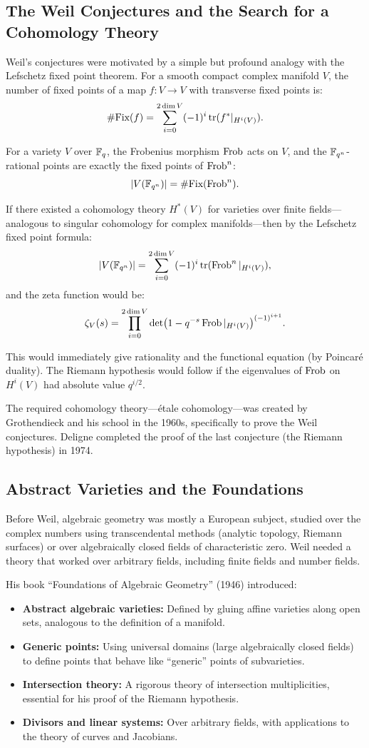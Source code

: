 \subsection{The Weil Conjectures and the Search for a Cohomology Theory}

Weil's conjectures were motivated by a simple but profound analogy with the Lefschetz fixed point theorem. For a smooth compact complex manifold $V$, the number of fixed points of a map $f: V \to V$ with transverse fixed points is:
\[
\#\text{Fix}(f) = \sum_{i=0}^{2\dim V} (-1)^i \operatorname{tr}(f^*|_{H^i(V)}).
\]

For a variety $V$ over $\mathbb{F}_q$, the Frobenius morphism $\operatorname{Frob}$ acts on $V$, and the $\mathbb{F}_{q^n}$-rational points are exactly the fixed points of $\operatorname{Frob}^n$:
\[
|V(\mathbb{F}_{q^n})| = \#\text{Fix}(\operatorname{Frob}^n).
\]

If there existed a cohomology theory $H^*(V)$ for varieties over finite fields---analogous to singular cohomology for complex manifolds---then by the Lefschetz fixed point formula:
\[
|V(\mathbb{F}_{q^n})| = \sum_{i=0}^{2\dim V} (-1)^i \operatorname{tr}(\operatorname{Frob}^n |_{H^i(V)}),
\]
and the zeta function would be:
\[
\zeta_V(s) = \prod_{i=0}^{2\dim V} \det(1 - q^{-s} \operatorname{Frob}|_{H^i(V)})^{(-1)^{i+1}}.
\]

This would immediately give rationality and the functional equation (by Poincar\'{e} duality). The Riemann hypothesis would follow if the eigenvalues of $\operatorname{Frob}$ on $H^i(V)$ had absolute value $q^{i/2}$.

The required cohomology theory---\'{e}tale cohomology---was created by Grothendieck and his school in the 1960s, specifically to prove the Weil conjectures. Deligne completed the proof of the last conjecture (the Riemann hypothesis) in 1974.

\subsection{Abstract Varieties and the Foundations}

Before Weil, algebraic geometry was mostly a European subject, studied over the complex numbers using transcendental methods (analytic topology, Riemann surfaces) or over algebraically closed fields of characteristic zero. Weil needed a theory that worked over arbitrary fields, including finite fields and number fields.

His book ``Foundations of Algebraic Geometry'' (1946) introduced:
\begin{itemize}
    \item \textbf{Abstract algebraic varieties:} Defined by gluing affine varieties along open sets, analogous to the definition of a manifold.
    \item \textbf{Generic points:} Using universal domains (large algebraically closed fields) to define points that behave like ``generic'' points of subvarieties.
    \item \textbf{Intersection theory:} A rigorous theory of intersection multiplicities, essential for his proof of the Riemann hypothesis.
    \item \textbf{Divisors and linear systems:} Over arbitrary fields, with applications to the theory of curves and Jacobians.
\end{itemize}

